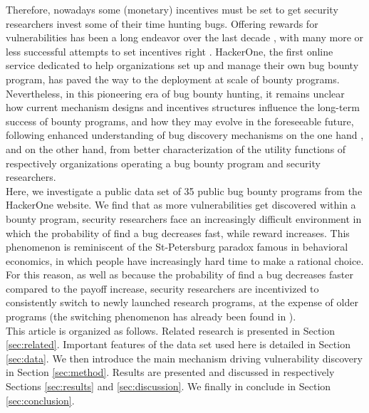 Therefore, nowadays some (monetary) incentives must be set to get security researchers invest some of their time hunting bugs. Offering rewards for vulnerabilities has been a long endeavor over the last decade \cite{bohme2006comparison}, with many more or less successful attempts to set incentives right \cite{finifter2013empirical,zhao2014exploratory,zhao2015empirical}. HackerOne, the first online service dedicated to help organizations set up and manage their own bug bounty program, has paved the way to the deployment at scale of bounty programs. Nevertheless, in this pioneering era of bug bounty hunting, it remains unclear how current mechanism designs and incentives structures influence the long-term success of bounty programs, and how they may evolve in the foreseeable future, following enhanced understanding of bug discovery mechanisms on the one hand \cite{zhao2016empirical}, and on the other hand, from better characterization of the utility functions of respectively organizations operating a bug bounty program and security researchers.\\

Here, we investigate a public data set of 35 public bug bounty programs from the HackerOne website. We find that as more vulnerabilities get discovered within a bounty program, security researchers face an increasingly difficult environment in which the probability of find a bug decreases fast, while reward increases. This phenomenon is reminiscent of the St-Petersburg paradox famous in behavioral economics, in which people have increasingly hard time to make a rational choice. For this reason, as well as because the probability of find a bug decreases faster compared to the payoff increase, security researchers are incentivized to consistently switch to newly launched research programs, at the expense of older programs (the switching phenomenon has already been found in \cite{zhao2015empirical}). \\

This article is organized as follows. Related research is presented in Section \ref{sec:related}. Important features of the data set used here is detailed in Section \ref{sec:data}. We then introduce the main mechanism driving vulnerability discovery in Section \ref{sec:method}. Results are presented and discussed in respectively Sections \ref{sec:results} and \ref{sec:discussion}. We finally in conclude in Section \ref{sec:conclusion}.